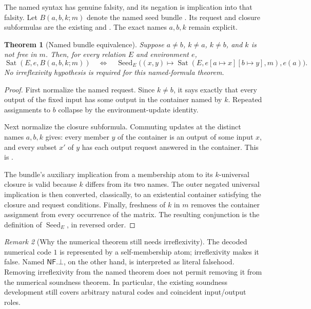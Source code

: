 \documentclass[11pt,letterpaper]{article}
\newtheorem{theorem}{Theorem}[section]
\theoremstyle{definition}
\theoremstyle{remark}
\newtheorem{remark}[theorem]{Remark}
\newcommand{\Sat}{\operatorname{Sat}}
\newcommand{\Seed}{\operatorname{Seed}}
\newcommand{\NF}{\mathsf{NF}}
\newcommand{\code}[1]{\texttt{\detokenize{#1}}}
\begin{document}
The named syntax has genuine falsity, and its negation is implication into that
falsity. Let \(B(a,b,k;m)\) denote the named seed bundle \code{bundleNF}. Its
request and closure subformulas are the existing \code{reqNF} and
\code{closNF}. The exact names \(a,b,k\) remain explicit.

\begin{theorem}[Named bundle equivalence]\label{thm:bundle}
Suppose \(a\ne b\), \(k\ne a\), \(k\ne b\), and \(k\) is not free in \(m\).
Then, for every relation \(E\) and environment \(e\),
\[
  \Sat(E,e,B(a,b,k;m))\quad\Longleftrightarrow\quad
  \Seed_E\bigl((x,y)\mapsto\Sat(E,e[a\mapsto x][b\mapsto y],m),e(a)\bigr).
\]
No irreflexivity hypothesis is required for this named-formula theorem.
\end{theorem}
\begin{proof}
First normalize the named request. Since \(k\ne b\), it says exactly that every
output of the fixed input has some output in the container named by \(k\).
Repeated assignments to \(b\) collapse by the environment-update identity.

Next normalize the closure subformula. Commuting updates at the distinct names
\(a,b,k\) gives: every member \(y\) of the container is an output of some input
\(x\), and every subset \(x'\) of \(y\) has each output request answered in the
container. This is \code{named_clos_iff}.

The bundle's auxiliary implication from a membership atom to its
\(k\)-universal closure is valid because \(k\) differs from its two names.
The outer negated universal implication is then converted, classically, to an
existential container satisfying the closure and request conditions. Finally,
freshness of \(k\) in \(m\) removes the container assignment from every
occurrence of the matrix. The resulting conjunction is the definition of
\(\Seed_E\), in reversed order.
\end{proof}

\begin{remark}[Why the numerical theorem still needs irreflexivity]
The decoded numerical code \(1\) is represented by a self-membership atom;
irreflexivity makes it false. Named \(\NF.\bot\), on the other hand, is interpreted
as literal falsehood. Removing irreflexivity from the named theorem does not
permit removing it from the numerical soundness theorem. In particular, the
existing soundness development still covers arbitrary natural codes and
coincident input/output roles.
\end{remark}
\end{document}
